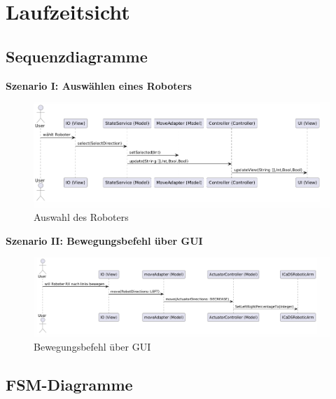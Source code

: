 
\chapter{Laufzeitsicht}

\section{Sequenzdiagramme}
\textbf{Szenario I: Auswählen eines Roboters}\\

\begin{figure}[h]
    \centering
    \includegraphics[width=0.8\linewidth]{diagrams/selectBefehl250625.png}
    \caption{Auswahl des Roboters}
    \label{fig:Auswahl}
\end{figure}

\clearpage\textbf{Szenario II: Bewegungsbefehl über GUI}\\

\begin{figure}[h]  
    \centering
    \includegraphics[width=0.8\linewidth]{diagrams/moveBefehl250625.png}
    \caption{Bewegungsbefehl über GUI}
    \label{fig:Bewegungsbefehl}
\end{figure}



\clearpage
\section{FSM-Diagramme}


